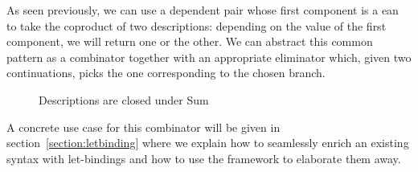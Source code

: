 As seen previously, we can use a dependent pair whose first component
is a ean to take the coproduct of two descriptions: depending
on the value of the first component, we will return one or the other.
We can abstract this common pattern as a combinator  together
with an appropriate eliminator  which, given two continuations,
picks the one corresponding to the chosen branch.

\begin{figure}[h]
\begin{minipage}{0.35\textwidth}
\end{minipage}\hfill
\begin{minipage}{0.55\textwidth}
\end{minipage}
\caption{Descriptions are closed under Sum}\label{figure:descsum}
\end{figure}



A concrete use case for this combinator will be given in section~\ref{section:letbinding}
where we explain how to seamlessly enrich an existing syntax with let-bindings
and how to use the \semrec{} framework to elaborate them away.





